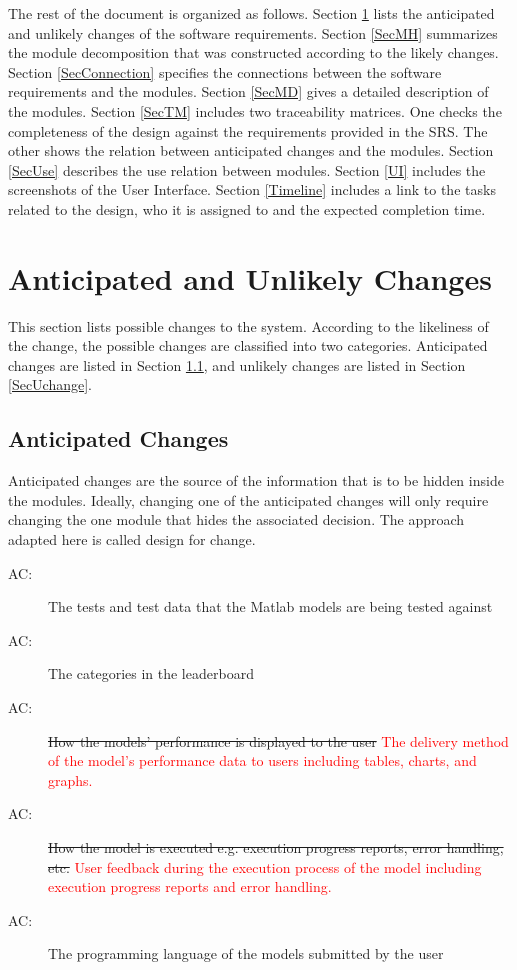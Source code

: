 \documentclass[12pt, titlepage]{article}
\newcounter{acnum}
\newcommand{\actheacnum}{AC\theacnum}
\begin{document}
The rest of the document is organized as follows. Section
\ref{SecChange} lists the anticipated and unlikely changes of the software
requirements. Section \ref{SecMH} summarizes the module decomposition that
was constructed according to the likely changes. Section \ref{SecConnection}
specifies the connections between the software requirements and the
modules. Section \ref{SecMD} gives a detailed description of the
modules. Section \ref{SecTM} includes two traceability matrices. One checks
the completeness of the design against the requirements provided in the SRS. The
other shows the relation between anticipated changes and the modules. Section
\ref{SecUse} describes the use relation between modules. Section
\ref{UI} includes the screenshots of the User Interface. Section \ref{Timeline} includes a link to the tasks related to the design, who it is assigned to and the expected completion time.

\section{Anticipated and Unlikely Changes} \label{SecChange}

This section lists possible changes to the system. According to the likeliness
of the change, the possible changes are classified into two
categories. Anticipated changes are listed in Section \ref{SecAchange}, and
unlikely changes are listed in Section \ref{SecUchange}.

\subsection{Anticipated Changes} \label{SecAchange}

Anticipated changes are the source of the information that is to be hidden
inside the modules. Ideally, changing one of the anticipated changes will only
require changing the one module that hides the associated decision. The approach
adapted here is called design for
change.

\begin{description}
\item[ \actheacnum \label{acTest}:] The tests and test data that the Matlab models are being tested against
\item[ \actheacnum \label{acLeaderboard}:] The categories in the leaderboard
\item[ \actheacnum \label{acDisplay}:] \sout{How the models' performance is displayed to the user} \textcolor{red}{The delivery method of the model's performance data to users including tables, charts, and graphs. }
\item[ \actheacnum \label{acExecute}:] \sout{How the model is executed e.g. execution progress reports, error handling, etc.} \textcolor{red}{User feedback during the execution process of the model including execution progress reports and error handling.}
\item[ \actheacnum \label{acLanguage}:] The programming language of the models submitted by the user
\end{description}
\end{document}
